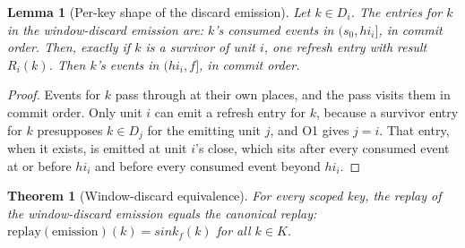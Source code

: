 \documentclass[sigconf,nonacm,10pt]{acmart}
\theoremstyle{plain}
\newtheorem{theorem}{Theorem}
\newtheorem{lemma}{Lemma}[section]
\theoremstyle{definition}
\newcommand{\window}[2]{(#1,#2]}                 %
\newcommand{\sink}{\mathit{sink}}                %
\newcommand{\keys}{K}                            %
\begin{document}
\begin{lemma}[Per-key shape of the discard emission]
\label{lem:discard-shape}
Let $k \in D_i$. The entries for $k$ in the window-discard
emission are: $k$'s consumed events in $\window{s_0}{hi_i}$, in
commit order. Then, exactly if $k$ is a survivor of unit $i$, one
refresh entry with result $R_i(k)$. Then $k$'s events in
$\window{hi_i}{f}$, in commit order.
\end{lemma}

\begin{proof}
Events for $k$ pass through at their own places, and the pass
visits them in commit order. Only unit $i$ can emit a refresh
entry for $k$, because a survivor entry for $k$ presupposes
$k \in D_j$ for the emitting unit $j$, and O1 gives $j = i$. That
entry, when it exists, is emitted at unit $i$'s close, which sits
after every consumed event at or before $hi_i$ and before every
consumed event beyond $hi_i$.
\end{proof}

\begin{theorem}[Window-discard equivalence]\label{thm:discard}
For every scoped key, the replay of the window-discard emission
equals the canonical replay:
$\mathrm{replay}(\text{emission})(k) = \sink_f(k)$ for all
$k \in \keys$.
\end{theorem}
\end{document}
